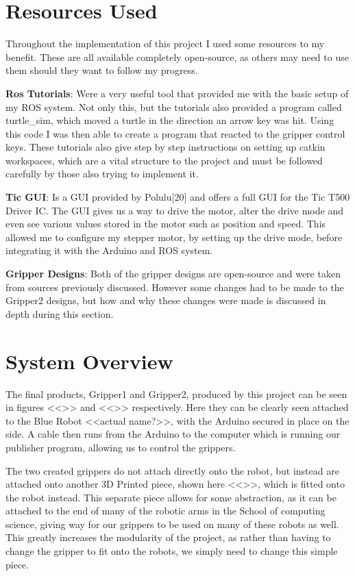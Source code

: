 \documentclass{l4proj}
\begin{document}
\section{Resources Used}
Throughout the implementation of this project I used some resources to my benefit. These are all available completely open-source, as others may need to use them should they want to follow my progress. 

\textbf{Ros Tutorials}: Were a very useful tool that provided me with the basic setup of my ROS system. Not only this, but the tutorials also provided a program called turtle\_sim, which moved a turtle in the direction an arrow key was hit. Using this code I was then able to create a program that reacted to the gripper control keys. These tutorials also give step by step instructions on setting up catkin workspaces, which are a vital structure to the project and must be followed carefully by those also trying to implement it. 

\textbf{Tic GUI}: Is a GUI provided by Polulu[20] and offers a full GUI for the Tic T500 Driver IC. The GUI gives us a way to drive the motor, alter the drive mode and even see various values stored in the motor such as position and speed. This allowed me to configure my stepper motor, by setting up the drive mode, before integrating it with the Arduino and ROS system. 

\textbf{Gripper Designs}: Both of the gripper designs are open-source and were taken from sources previously discussed. However some changes had to be made to the Gripper2 designs, but how and why these changes were made is discussed in depth during this section. 

\section{System Overview}
The final products, Gripper1 and Gripper2, produced by this project can be seen in figures <<>> and <<>> respectively. Here they can be clearly seen attached to the Blue Robot <<actual name?>>, with the Arduino secured in place on the side. A cable then runs from the Arduino to the computer which is running our publisher program, allowing us to control the grippers. 

The two created grippers do not attach directly onto the robot, but instead are attached onto another 3D Printed piece, shown here <<>>, which is fitted onto the robot instead. This separate piece allows for some abstraction, as it can be attached to the end of many of the robotic arms in the School of computing science, giving way for our grippers to be used on many of these robots as well. This greatly increases the modularity of the project, as rather than having to change the gripper to fit onto the robots, we simply need to change this simple piece. 
\end{document}
